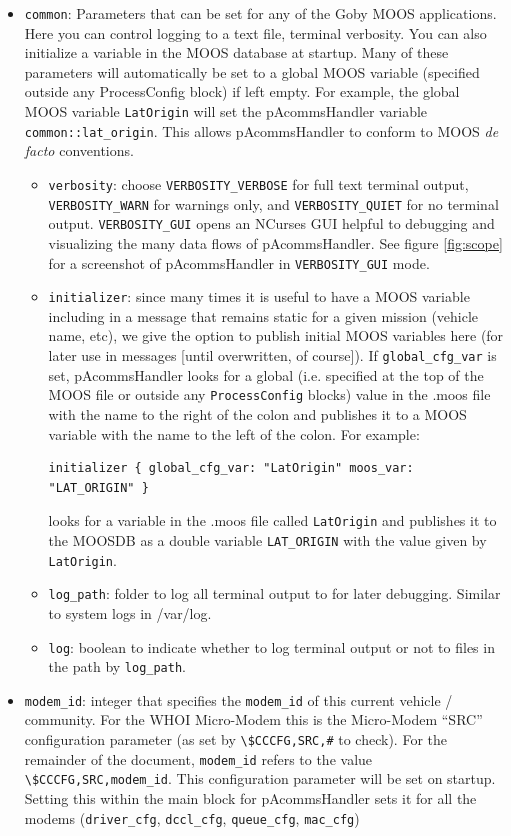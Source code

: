 \documentclass[11pt, letterpaper, oneside]{memoir}
\begin{document}
\begin{itemize}
\item \verb|common|: Parameters that can be set for any of the Goby MOOS applications. Here you can control logging to a text file, terminal verbosity. You can also initialize a variable in the MOOS database at startup. Many of these parameters will automatically be set to a global MOOS variable (specified outside any ProcessConfig block) if left empty. For example, the global MOOS variable \verb|LatOrigin| will set the pAcommsHandler variable \verb|common::lat_origin|. This allows pAcommsHandler to conform to MOOS \textit{de facto} conventions.
\begin{itemize}
\item \verb|verbosity|: choose \verb|VERBOSITY_VERBOSE| for full text terminal output, \verb|VERBOSITY_WARN| for warnings only, and \verb|VERBOSITY_QUIET| for no terminal output. \verb|VERBOSITY_GUI| opens an NCurses GUI helpful to debugging and visualizing the many data flows of pAcommsHandler. See figure \ref{fig:scope} for a screenshot of pAcommsHandler in \verb|VERBOSITY_GUI| mode. 
\item \verb|initializer|: since many times it is useful to have a MOOS variable including in a message that remains static for a given mission (vehicle name, etc), we give the option to publish initial MOOS variables here (for later use in messages [until overwritten, of course]). If \verb|global_cfg_var| is set, pAcommsHandler looks for a global (i.e. specified at the top of the MOOS file or outside any \verb|ProcessConfig| blocks) value in the .moos file with the name to the right of the colon and publishes it to a MOOS variable with the name to the left of the colon. For example:
\begin{verbatim}
initializer { global_cfg_var: "LatOrigin" moos_var: "LAT_ORIGIN" } 
\end{verbatim}
\resetbvlinenumber
looks for a variable in the .moos file called \verb|LatOrigin| and publishes it to the MOOSDB as a double variable \verb|LAT_ORIGIN| with the value given by \verb|LatOrigin|.
\item \verb|log_path|: folder to log all terminal output to for later debugging. Similar to system logs in /var/log.
\item \verb|log|: boolean to indicate whether to log terminal output or not to files in the path by \verb|log_path|.
\end{itemize}
\item \verb|modem_id|: integer that specifies the \verb|modem_id| of this current vehicle / community. For the WHOI Micro-Modem this is the Micro-Modem ``SRC'' configuration parameter (as set by \verb|\$CCCFG,SRC,#| to check). For the remainder of the document, \verb|modem_id| refers to the value \verb|\$CCCFG,SRC,modem_id|. This configuration parameter will be set on startup. Setting this within the main block for pAcommsHandler sets it for all the modems (\verb|driver_cfg|, \verb|dccl_cfg|, \verb|queue_cfg|, \verb|mac_cfg|)

\end{itemize}
\end{document}
